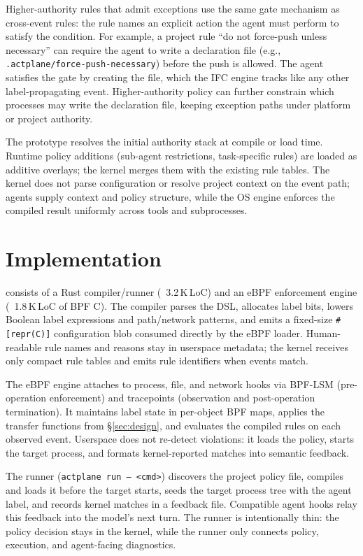 Higher-authority rules that admit exceptions use the same gate mechanism
as cross-event rules: the rule names an explicit action the agent must
perform to satisfy the condition. For example, a project rule ``do not
force-push unless necessary'' can require the agent to write a
declaration file (e.g., \texttt{.actplane/force-push-necessary}) before
the push is allowed. The agent satisfies the gate by creating the file, which the IFC
engine tracks like any other label-propagating event. Higher-authority policy can further constrain
which processes may write the declaration file, keeping exception paths
under platform or project authority.

The prototype resolves the initial authority stack at compile or load
time. Runtime policy additions (sub-agent restrictions, task-specific
rules) are loaded as additive overlays; the kernel merges them with the
existing rule tables. The kernel does not parse configuration or resolve
project context on the event path; agents supply context and policy
structure, while the OS engine enforces the compiled result uniformly
across tools and subprocesses.

\section{Implementation}
\label{sec:implementation}

\sys{} consists of a Rust compiler/runner (~3.2\,K\,LoC) and an eBPF
enforcement engine (~1.8\,K\,LoC of BPF C). The compiler parses the DSL,
allocates label bits, lowers Boolean label expressions and path/network
patterns, and emits a fixed-size \texttt{\#[repr(C)]} configuration blob
consumed directly by the eBPF loader. Human-readable rule names and
reasons stay in userspace metadata; the kernel receives only compact rule
tables and emits rule identifiers when events match.

The eBPF engine attaches to process, file, and network hooks via BPF-LSM
(pre-operation enforcement) and tracepoints (observation and
post-operation termination). It maintains label state in per-object BPF
maps, applies the transfer functions from \S\ref{sec:design}, and
evaluates the compiled rules on each observed event. Userspace does not
re-detect violations: it loads the policy, starts the target process, and
formats kernel-reported matches into semantic feedback.

The runner (\texttt{actplane run -- <cmd>}) discovers the project policy
file, compiles and loads it before the target starts, seeds the target
process tree with the agent label, and records kernel matches in a
feedback file. Compatible agent hooks relay this feedback into the model's
next turn. The runner is intentionally thin: the policy decision stays in
the kernel, while the runner only connects policy, execution, and
agent-facing diagnostics.
